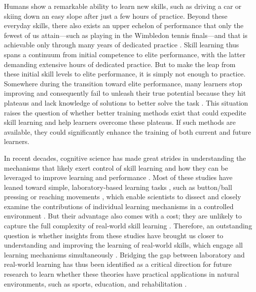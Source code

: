 
Humans show a remarkable ability to learn new skills, such as driving a car or skiing down an easy slope after just a few hours of practice. Beyond these everyday skills, there also exists an upper echelon of performance that only the fewest of us attain—such as playing in the Wimbledon tennis finals—and that is achievable only through many years of dedicated practice \parencite{hodges_predicting_2004, ericsson_role_1993, vaeyens_talent_2009, ericsson_expert_1994, ericsson_scientific_1998}. Skill learning thus spans a continuum from initial competence to elite performance, with the latter demanding extensive hours of dedicated practice. But to make the leap from these initial skill levels to elite performance, it is simply not enough to practice. Somewhere during the transition toward elite performance, many learners stop improving and consequently fail to unleash their true potential because they hit plateaus and lack knowledge of solutions to better solve the task \parencite{thorndike_educational_1913, grayloooooong,grayshort,ericsson_scientific_1998, ericsson_development_2003}. This situation raises the question of whether better training methods exist that could expedite skill learning and help learners overcome these plateaus. If such methods are available, they could significantly enhance the training of both current and future learners. 

In recent decades, cognitive science has made great strides in understanding the mechanisms that likely exert control of skill learning and how they can be leveraged to improve learning and performance \parencite{wolpert_principles_2011, makino_circuit_2016, spampinato_multiple_2021, krakauer_motor_2019, haith_model-based_2013, huang_rethinking_2011, shmuelof_are_2011, doya_complementary_2000, yarrow_inside_2009}. Most of these studies have leaned toward simple, laboratory-based learning tasks \parencite{krakauer_motor_2019, du_relationship_2022}, such as button/ball pressing \parencite{hardwick_time-dependent_2019, vassiliadis_reward_2021} or reaching movements \parencite{shadmehr_adaptive_1994, krakauer_learning_2000}, which enable scientists to dissect and closely examine the contributions of individual learning mechanisms in a controlled environment \parencite{spampinato_multiple_2021}. But their advantage also comes with a cost; they are unlikely to capture the full complexity of real-world skill learning \parencite{krakauer_motor_2019, mangalam_investigating_2023, du_relationship_2022, chen_effects_2018, wolpert_principles_2011, gallivan_decision-making_2018, iyer_probing_2020, ingram_naturalistic_2011}. Therefore, an outstanding question is whether insights from these studies have brought us closer to understanding and improving the learning of real-world skills, which engage all learning mechanisms simultaneously \parencite{spampinato_multiple_2021}. Bridging the gap between laboratory and real-world learning has thus been identified as a critical direction for future research to learn whether these theories have practical applications in natural environments, such as sports, education, and rehabilitation \parencite{du_relationship_2022, wolpert_motor_2010, yarrow_inside_2009, haar_motor_2020, ingram_naturalistic_2011, mangalam_investigating_2023, tsay_bridging_2024, spampinato_multiple_2021}.

